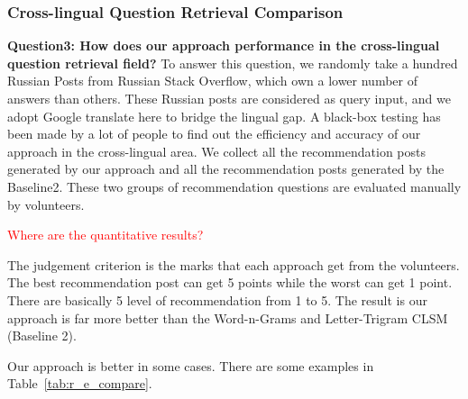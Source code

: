 \subsubsection{Cross-lingual Question Retrieval Comparison}	
	{\bf Question3: How does our approach performance in the cross-lingual question retrieval field?}
To answer this question, we randomly take a hundred Russian Posts from Russian Stack Overflow, which own a lower number of answers than others. These Russian posts are considered as query input, and we adopt Google translate here to bridge the lingual gap. A black-box testing has been made by a lot of people to find out the efficiency and accuracy of our approach in the cross-lingual area. We collect all the recommendation posts generated by our approach and all the recommendation posts generated by the Baseline2. These two groups of recommendation questions are evaluated manually by volunteers. 

\textcolor{red}{Where are the quantitative results?}

The judgement criterion is the marks that each approach get from the volunteers. The best recommendation post can get 5 points while the worst can get 1 point. There are basically 5 level of recommendation from 1 to 5. The result is our approach is far more better than the Word-n-Grams and Letter-Trigram CLSM (Baseline 2). 
\par Our approach is better in some cases. There are some examples in Table~\ref{tab:r_e_compare}.

